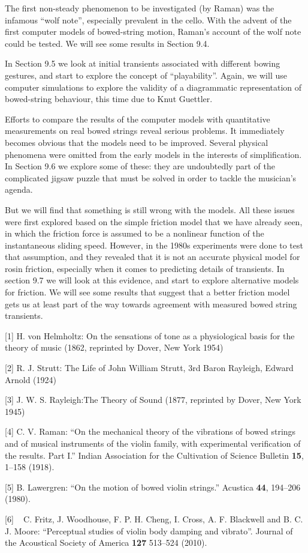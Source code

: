   The first non-steady phenomenon to be investigated (by Raman) was the 
  infamous “wolf note”, especially prevalent in the cello. With the advent of 
  the first computer models of bowed-string motion, Raman’s account of the wolf 
  note could be tested. We will see some results in Section 9.4. 

  In Section 9.5 we look at initial transients associated with different bowing 
  gestures, and start to explore the concept of “playability”. Again, we will 
  use computer simulations to explore the validity of a diagrammatic 
  representation of bowed-string behaviour, this time due to Knut Guettler. 

  Efforts to compare the results of the computer models with quantitative 
  measurements on real bowed strings reveal serious problems. It immediately 
  becomes obvious that the models need to be improved. Several physical 
  phenomena were omitted from the early models in the interests of 
  simplification. In Section 9.6 we explore some of these: they are undoubtedly 
  part of the complicated jigsaw puzzle that must be solved in order to tackle 
  the musician's agenda. 

  But we will find that something is still wrong with the models. All these 
  issues were first explored based on the simple friction model that we have 
  already seen, in which the friction force is assumed to be a nonlinear 
  function of the instantaneous sliding speed. However, in the 1980s 
  experiments were done to test that assumption, and they revealed that it is 
  not an accurate physical model for rosin friction, especially when it comes 
  to predicting details of transients. In section 9.7 we will look at this 
  evidence, and start to explore alternative models for friction. We will see 
  some results that suggest that a better friction model gets us at least part 
  of the way towards agreement with measured bowed string transients. 



  \sectionreferences{}[1] H. von Helmholtz: On the sensations of tone as a 
  physiological basis for the theory of music (1862, reprinted by Dover, New 
  York 1954) 

  [2] R. J. Strutt: The Life of John William Strutt, 3rd Baron Rayleigh, Edward 
  Arnold (1924) 

  [3] J. W. S. Rayleigh:The Theory of Sound (1877, reprinted by Dover, New York 
  1945) 

  [4] C. V. Raman: ``On the mechanical theory of the vibrations of bowed 
  strings and of musical instruments of the violin family, with experimental 
  verification of the results. Part I.'' Indian Association for the Cultivation 
  of Science Bulletin \textbf{15}, 1–158 (1918). 

  [5] B. Lawergren: ``On the motion of bowed violin strings.'' Acustica 
  \textbf{44}, 194–206 (1980). 

  [6] ~ C. Fritz, J. Woodhouse, F. P. H. Cheng, I. Cross, A. F. Blackwell and 
  B. C. J. Moore: ``Perceptual studies of violin body damping and vibrato''. 
  Journal of the Acoustical Society of America \textbf{127} 513--524 (2010). 
